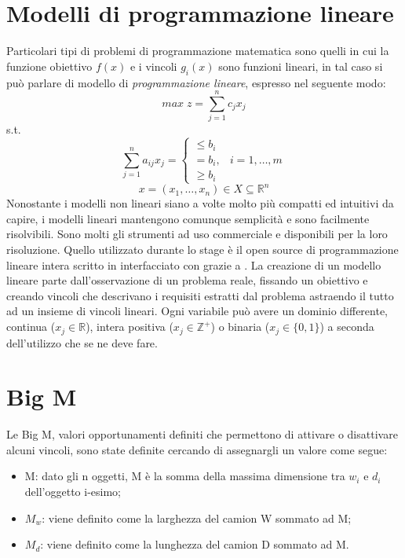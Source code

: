 \section{Modelli di programmazione lineare}
Particolari tipi di problemi di programmazione matematica sono quelli in cui la funzione obiettivo $f(x)$ e i vincoli $g_i(x)$ sono funzioni lineari, in tal caso si può parlare di modello di \textit{programmazione lineare}, espresso nel seguente modo:
$$ max\; z = \sum_{j=1}^n c_j x_j $$
s.t.
$$\sum_{j=1}^n a_{ij} x_j = \begin{cases} \leq b_i \\ = b_i, & i = 1,\dots,m \\ \geq b_i \end{cases}$$
$$x = (x_1,\dots,x_n) \in X \subseteq \mathbb{R}^n$$
Nonostante i modelli non lineari siano a volte molto più compatti ed intuitivi da capire, i modelli lineari mantengono comunque semplicità e sono facilmente risolvibili. Sono molti gli strumenti ad uso commerciale e  disponibili per la loro risoluzione. Quello utilizzato durante lo stage è il  open source di programmazione lineare intera  scritto in  interfacciato con  grazie a . La creazione di un modello lineare parte dall'osservazione di un problema reale, fissando un obiettivo e creando vincoli che descrivano i requisiti estratti dal problema astraendo il tutto ad un insieme di vincoli lineari.
Ogni variabile può avere un dominio differente, continua ($x_j \in \mathbb{R}$), intera positiva ($x_j \in \mathbb{Z}^+$) o binaria ($x_j \in \{0,1\}$) a seconda dell'utilizzo che se ne deve fare.
\section{Big M}
Le Big M, valori opportunamenti definiti che permettono di attivare o disattivare alcuni vincoli, sono state definite cercando di assegnargli un valore come segue:
\begin{itemize}
	\item M: dato gli n oggetti, M è la somma della massima dimensione tra $w_i$ e $d_i$ dell'oggetto i-esimo;
	\item $M_w$: viene definito come la larghezza del camion W sommato ad M;
	\item $M_d$: viene definito come la lunghezza del camion D sommato ad M.
\end{itemize}

